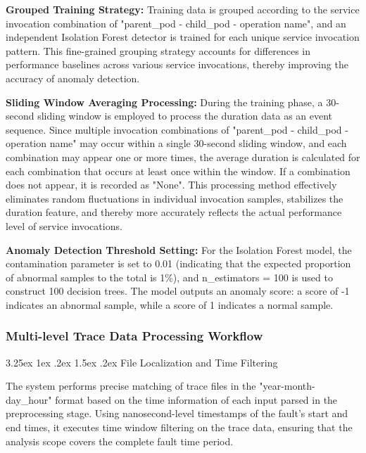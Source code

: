 \documentclass[10pt]{article}
\makeatletter
\renewcommand{\paragraph}{%
    \@startsection{paragraph}{4}{\z@}%
    {3.25ex \@plus1ex \@minus.2ex}%
    {1.5ex \@plus.2ex}%
    {\normalfont\normalsize\itshape}%
}
\makeatother
\begin{document}
\textbf{Grouped Training Strategy:} Training data is grouped according to the service invocation combination of "parent\_pod - child\_pod - operation name", and an independent Isolation Forest detector is trained for each unique service invocation pattern. This fine-grained grouping strategy accounts for differences in performance baselines across various service invocations, thereby improving the accuracy of anomaly detection.

\textbf{Sliding Window Averaging Processing:} During the training phase, a 30-second sliding window is employed to process the duration data as an event sequence. Since multiple invocation combinations of "parent\_pod - child\_pod - operation name" may occur within a single 30-second sliding window, and each combination may appear one or more times, the average duration is calculated for each combination that occurs at least once within the window. If a combination does not appear, it is recorded as "None". This processing method effectively eliminates random fluctuations in individual invocation samples, stabilizes the duration feature, and thereby more accurately reflects the actual performance level of service invocations.

\textbf{Anomaly Detection Threshold Setting:} For the Isolation Forest model, the contamination parameter is set to 0.01 (indicating that the expected proportion of abnormal samples to the total is 1\%), and n\_estimators = 100 is used to construct 100 decision trees. The model outputs an anomaly score: a score of -1 indicates an abnormal sample, while a score of 1 indicates a normal sample.

\subsubsection{Multi-level Trace Data Processing Workflow}

\paragraph{File Localization and Time Filtering}

The system performs precise matching of trace files in the "year-month-day\_hour" format based on the time information of each input parsed in the preprocessing stage. Using nanosecond-level timestamps of the fault's start and end times, it executes time window filtering on the trace data, ensuring that the analysis scope covers the complete fault time period.
\end{document}
